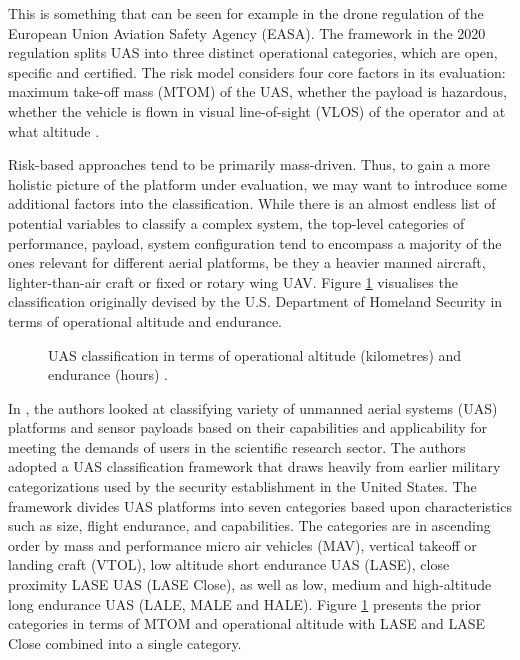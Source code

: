 \documentclass[english, 12pt, a4paper, elec, utf8, a-1b, online]{aaltothesis}
\begin{document}
This is something that can be seen for example in the drone regulation of the European Union Aviation Safety Agency (EASA).
The framework in the 2020 regulation splits UAS into three distinct operational categories, which are open, specific and certified.
The risk model considers four core factors in its evaluation: maximum take-off mass (MTOM) of the UAS, whether the payload is hazardous, whether the vehicle is flown in visual line-of-sight (VLOS) of the operator and at what altitude \cite{alamouri2021exploratory}.

Risk-based approaches tend to be primarily mass-driven. Thus, to gain a more holistic picture of the platform under evaluation, we may want to introduce some additional factors into the classification.
While there is an almost endless list of potential variables to classify a complex system, the top-level categories of performance, payload, system configuration tend to encompass a majority of the ones relevant for different aerial platforms, be they a heavier manned aircraft, lighter-than-air craft or fixed or rotary wing UAV.
Figure \ref{fig-3d-dhs-uas-classification} visualises the classification originally devised by the U.S.
Department of Homeland Security in terms of operational altitude and endurance.

\begin{figure}[h]
  \centering
  
  \caption{UAS classification in terms of operational altitude (kilometres) and endurance (hours) \cite{watts2012unmanned}.}
  \label{fig-3d-dhs-uas-classification}
\end{figure}

In \cite{watts2012unmanned}, the authors looked at classifying variety of unmanned aerial systems (UAS) platforms and sensor payloads based on their capabilities and applicability for meeting the demands of users in the scientific research sector.
The authors adopted a UAS classification framework that draws heavily from earlier military categorizations used by the security establishment in the United States.
The framework divides UAS platforms into seven categories based upon characteristics such as size, flight endurance, and capabilities.
The categories are in ascending order by mass and performance micro air vehicles (MAV), vertical takeoff or landing craft (VTOL), low altitude short endurance UAS (LASE), close proximity LASE UAS (LASE Close), as well as low, medium and high-altitude long endurance UAS (LALE, MALE and HALE).
Figure \ref{fig-3d-dhs-uas-classification} presents the prior categories in terms of MTOM and operational altitude with LASE and LASE Close combined into a single category.
\end{document}
